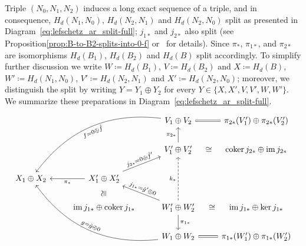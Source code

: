 \documentclass[letterpaper,11pt]{article}
\theoremstyle{plain}
\theoremstyle{definition}
\newcommand{\im}{\operatorname{im}}
\newcommand{\coker}{\operatorname{coker}}
\newcounter{li}
\newcommand{\imapx}[1]{j_{#1\ast}}
\newcommand{\projmapx}[1]{\pi_{#1\ast}}
\begin{document}
{Triple $(N_0, N_1, N_2)$ induces a long exact sequence of a triple, and in consequence, $H_d(N_1,N_0)$, $H_d(N_2,N_1)$ and $H_d(N_2,N_0)$ split as presented in Diagram~\eqref{eq:lefschetz_ar_split-full};
    $\imapx{1}$ and $\imapx{2}$ also split 
    (see Proposition\ref{prop:B-to-B2-splits-into-0-f} or~\cite[Theorem~5.12]{CMbarcodes2025} for details).
Since $\projmapx{}$, $\projmapx{1}$, and $\projmapx{2}$ are isomorphisms $H_d(B_1)$, $H_d(B_2)$ and $H_d(B)$ split accordingly.
To simplify further discussion we write 
    $W\coloneqq H_d(B_1)$, $V\coloneqq H_d(B_2)$ and $X\coloneqq H_d(B)$, 
    $W'\coloneqq H_d(N_1,N_0)$, $V'\coloneqq H_d(N_2,N_1)$ and $X'\coloneqq H_d(N_2,N_0)$;
    moreover, we distinguish the split by writing $Y=Y_1\oplus Y_2$ for every $Y\in\{X,X',V,V', W,W'\}$.
We summarize these preparations in Diagram~\eqref{eq:lefschetz_ar_split-full}.
\begin{equation}\label{eq:lefschetz_ar_split-full}
    \begin{tikzcd}%
        & & V_1\oplus V_2\arrow[lldd, bend right, "f=0\oplus\hat{f}", swap, sloped]
            & \projmapx{2}(V_1')\oplus \projmapx{2}(V_2') \ar[l, equal]  \\
        & & V_1'\oplus V_2'\arrow[u,"\projmapx{2}"]
            & \coker\imapx{2}\oplus \im\imapx{2} \ar[l,phantom, "\cong"]  \\
        X_1\oplus X_2 & X_1'\oplus X_2'\arrow[l,"\projmapx{}"]\arrow[ru, "\imapx{2}=0\oplus\hat{f}'", sloped] &\\
        & \im\imapx{1}\oplus\coker\imapx{1}\ar[u, phantom, "\cong", sloped] 
            & W_1'\oplus W_2'\arrow[d,"\projmapx{1}"]\arrow[lu, "\imapx{1}=\hat{g}'\oplus 0", sloped]\arrow[uu, "k_\ast", dashed]
            & \im \imapx{1}\oplus\ker\imapx{1} \ar[l,phantom, "\cong"]  \\
        & & W_1\oplus W_2\arrow[lluu, bend left, "g=\hat{g}\oplus 0", sloped]
            & \projmapx{1}(W_1')\oplus \projmapx{1}(W_2') \ar[l,equal]
    \end{tikzcd}
\end{equation}

    
}
\end{document}
